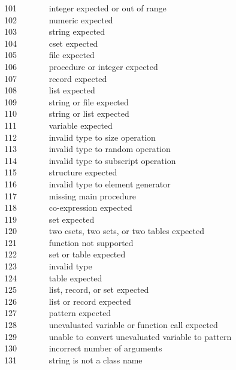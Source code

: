 101 \ \ \ \ \ \ \ integer expected or out of range\\
102 \ \ \ \ \ \ \ numeric expected\\
103 \ \ \ \ \ \ \ string expected\\
104 \ \ \ \ \ \ \ cset expected\\
105 \ \ \ \ \ \ \ file expected\\
106 \ \ \ \ \ \ \ procedure or integer expected\\
107 \ \ \ \ \ \ \ record expected\\
108 \ \ \ \ \ \ \ list expected\\
109 \ \ \ \ \ \ \ string or file expected\\
110 \ \ \ \ \ \ \ string or list expected\\
111 \ \ \ \ \ \ \ variable expected\\
112 \ \ \ \ \ \ \ invalid type to size operation\\
113 \ \ \ \ \ \ \ invalid type to random operation\\
114 \ \ \ \ \ \ \ invalid type to subscript operation\\
115 \ \ \ \ \ \ \ structure expected\\
116 \ \ \ \ \ \ \ invalid type to element generator\\
117 \ \ \ \ \ \ \ missing main procedure\\
118 \ \ \ \ \ \ \ co-expression expected\\
119 \ \ \ \ \ \ \ set expected\\
120 \ \ \ \ \ \ \ two csets, two sets, or two tables expected\\
121 \ \ \ \ \ \ \ function not supported\\
122 \ \ \ \ \ \ \ set or table expected\\
123 \ \ \ \ \ \ \ invalid type\\
124 \ \ \ \ \ \ \ table expected\\
125 \ \ \ \ \ \ \ list, record, or set expected\\
126 \ \ \ \ \ \ \ list or record expected\\
127 \ \ \ \ \ \ \ pattern expected\\
128 \ \ \ \ \ \ \ unevaluated variable or function call expected\\
129 \ \ \ \ \ \ \ unable to convert unevaluated variable to pattern\\
130 \ \ \ \ \ \ \ incorrect number of arguments\\
131 \ \ \ \ \ \ \ string is not a class name\\
